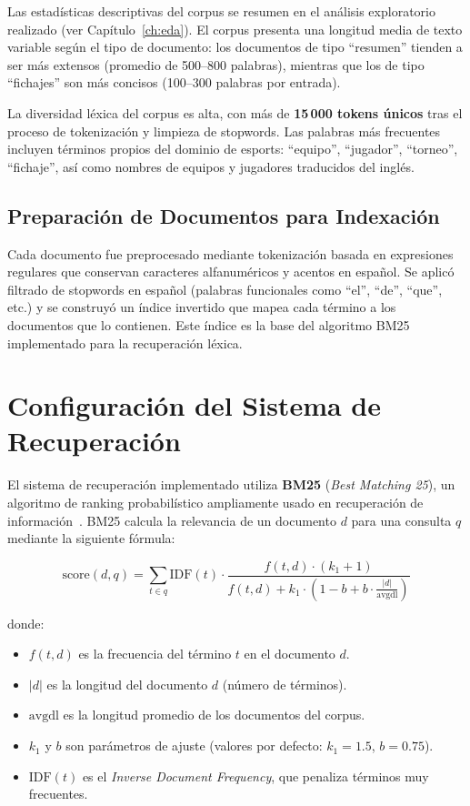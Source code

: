 Las estadísticas descriptivas del corpus se resumen en el análisis exploratorio realizado (ver Capítulo~\ref{ch:eda}). El corpus presenta una longitud media de texto variable según el tipo de documento: los documentos de tipo ``resumen'' tienden a ser más extensos (promedio de 500--800 palabras), mientras que los de tipo ``fichajes'' son más concisos (100--300 palabras por entrada).

La diversidad léxica del corpus es alta, con más de \textbf{15\,000 tokens únicos} tras el proceso de tokenización y limpieza de stopwords. Las palabras más frecuentes incluyen términos propios del dominio de esports: ``equipo'', ``jugador'', ``torneo'', ``fichaje'', así como nombres de equipos y jugadores traducidos del inglés.

\subsection{Preparación de Documentos para Indexación}

Cada documento fue preprocesado mediante tokenización basada en expresiones regulares que conservan caracteres alfanuméricos y acentos en español. Se aplicó filtrado de stopwords en español (palabras funcionales como ``el'', ``de'', ``que'', etc.) y se construyó un índice invertido que mapea cada término a los documentos que lo contienen. Este índice es la base del algoritmo BM25 implementado para la recuperación léxica.

\section{Configuración del Sistema de Recuperación}

El sistema de recuperación implementado utiliza \textbf{BM25} (\textit{Best Matching 25}), un algoritmo de ranking probabilístico ampliamente usado en recuperación de información~\cite{robertson2009probabilistic}. BM25 calcula la relevancia de un documento $d$ para una consulta $q$ mediante la siguiente fórmula:

\[
\text{score}(d, q) = \sum_{t \in q} \text{IDF}(t) \cdot \frac{f(t, d) \cdot (k_1 + 1)}{f(t, d) + k_1 \cdot (1 - b + b \cdot \frac{|d|}{\text{avgdl}})}
\]

donde:
\begin{itemize}
    \item $f(t, d)$ es la frecuencia del término $t$ en el documento $d$.
    \item $|d|$ es la longitud del documento $d$ (número de términos).
    \item $\text{avgdl}$ es la longitud promedio de los documentos del corpus.
    \item $k_1$ y $b$ son parámetros de ajuste (valores por defecto: $k_1 = 1.5$, $b = 0.75$).
    \item $\text{IDF}(t)$ es el \textit{Inverse Document Frequency}, que penaliza términos muy frecuentes.
\end{itemize}

